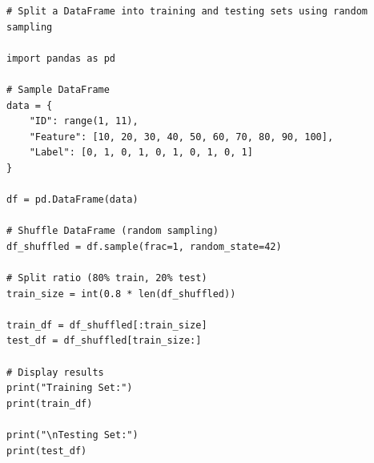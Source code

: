 \begin{verbatim}
# Split a DataFrame into training and testing sets using random 
sampling

import pandas as pd

# Sample DataFrame
data = {
    "ID": range(1, 11),
    "Feature": [10, 20, 30, 40, 50, 60, 70, 80, 90, 100],
    "Label": [0, 1, 0, 1, 0, 1, 0, 1, 0, 1]
}

df = pd.DataFrame(data)

# Shuffle DataFrame (random sampling)
df_shuffled = df.sample(frac=1, random_state=42)

# Split ratio (80% train, 20% test)
train_size = int(0.8 * len(df_shuffled))

train_df = df_shuffled[:train_size]
test_df = df_shuffled[train_size:]

# Display results
print("Training Set:")
print(train_df)

print("\nTesting Set:")
print(test_df)
\end{verbatim}